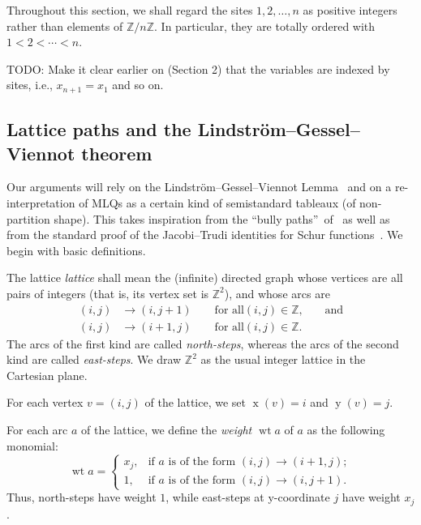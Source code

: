 \documentclass[reqno]{amsart}%
\newcommand{\0}{\phantom{c}}
\newcommand{\defn}[1]{{\color{darkred}\emph{#1}}}
\theoremstyle{plain}
\theoremstyle{definition}
\numberwithin{equation}{section}
\begin{document}
Throughout this section, we shall regard the sites $1,2,\ldots,n$ as positive
integers rather than elements of $\mathbb{Z}/n\mathbb{Z}$. In particular, they
are totally ordered with $1<2<\cdots<n$.

TODO: Make it clear earlier on (Section 2) that the variables are indexed by
sites, i.e., $x_{n+1}=x_{1}$ and so on.

\subsection{Lattice paths and the Lindstr\"{o}m--Gessel--Viennot theorem}

Our arguments will rely on the Lindstr\"om--Gessel--Viennot
Lemma~\cite{GV85,Lindstrom73} and on a re-interpretation of MLQs as a certain
kind of semistandard tableaux (of non-partition shape). This takes inspiration
from the \textquotedblleft bully paths\textquotedblright\ of~\cite{AasLin17}
as well as from the standard proof of the Jacobi--Trudi identities for Schur
functions~\cite[First proof of Theorem 7.16.1]{Stanley-EC2}. We begin with
basic definitions.

The lattice \defn{lattice} shall mean the (infinite) directed graph whose
vertices are all pairs of integers (that is, its vertex set is $\mathbb{Z}%
^{2}$), and whose arcs are
\begin{align*}
\left(  i,j\right)   &  \rightarrow\left(  i,j+1\right)  \qquad\text{for all
}\left(  i,j\right)  \in\mathbb{Z}\text{,}\qquad\text{and}\\
\left(  i,j\right)   &  \rightarrow\left(  i+1,j\right)  \qquad\text{for all
}\left(  i,j\right)  \in\mathbb{Z}\text{.}%
\end{align*}
The arcs of the first kind are called \defn{north-steps}, whereas the arcs of
the second kind are called \defn{east-steps}. We draw $\mathbb{Z}^{2}$ as the
usual integer lattice in the Cartesian plane.

For each vertex $v=\left(  i,j\right)  $ of the lattice, we set
$\operatorname*{x}\left(  v\right)  =i$ and $\operatorname*{y}\left(
v\right)  =j$.

For each arc $a$ of the lattice, we define the
\defn{weight $\operatorname{wt}a$} of $a$ as the following monomial:%
\[
\operatorname*{wt}a=%
\begin{cases}
x_{j}, & \text{if }a\text{ is of the form }\left(  i,j\right)  \rightarrow
\left(  i+1,j\right)  ;\\
1, & \text{if }a\text{ is of the form }\left(  i,j\right)  \rightarrow\left(
i,j+1\right)  .
\end{cases}
\]
Thus, north-steps have weight $1$, while east-steps at y-coordinate $j$ have
weight $x_{j}$.
\end{document}
